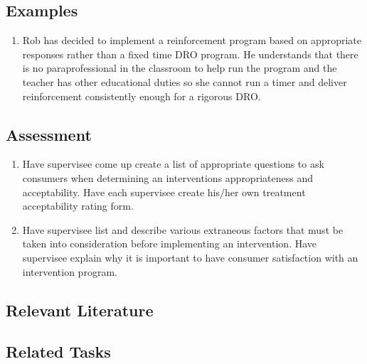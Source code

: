 \subsection{Examples}
\begin{enumerate}
\item Rob has decided to implement a reinforcement program based on appropriate responses rather than a fixed time DRO program. He understands that there is no paraprofessional in the classroom to help run the program and the teacher has other educational duties so she cannot run a timer and deliver reinforcement consistently enough for a rigorous DRO. 
%
\end{enumerate}
%
\subsection{Assessment}
\begin{enumerate}
\item Have supervisee come up create a list of appropriate questions to ask consumers when determining an interventions appropriateness and acceptability. Have each supervisee create his/her own treatment acceptability rating form.
\item Have supervisee list and describe various extraneous factors that must be taken into consideration before implementing an intervention. Have supervisee explain why it is important to have consumer satisfaction with an intervention program.
\end{enumerate}
%
\subsection{Relevant Literature}
\begin{refsection}
\nocite{cooper2007applied,
        hawkins1984meaningful,
        reimers1988parents,
        wolf1978social}
\printbibliography[heading=none]
\end{refsection}
%
\subsection{Related Tasks}
\fourcOne{}\\
\fourgSix{}\\
\fourgEight{}\\
\fouriOne{}\\
\fouriTwo{}\\
\fourjSix{}\\
\fourjEight{}\\
\fourkSeven{}\\
\fourkNine{}\\
\fourFKEleven{}\\
%
\clearpage \section[\fourkTwo{}]{\fourkTwo{}%
              }
